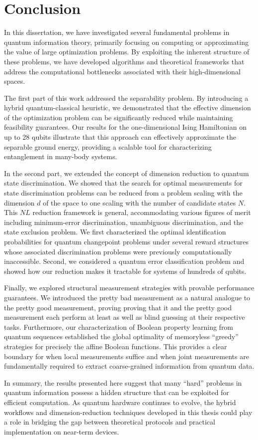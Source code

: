 \chapter{Conclusion}

In this dissertation, we have investigated several fundamental problems in quantum information theory, primarily focusing on computing or approximating the value of large optimization problems.
By exploiting the inherent structure of these problems, we have developed algorithms and theoretical frameworks that address the computational bottlenecks associated with their high-dimensional spaces.

The first part of this work addressed the separability problem. 
By introducing a hybrid quantum-classical heuristic, we demonstrated that the effective dimension of the optimization problem can be significantly reduced while maintaining feasibility guarantees. 
Our results for the one-dimensional Ising Hamiltonian on up to 28 qubits illustrate that this approach can effectively approximate the separable ground energy, providing a scalable tool for characterizing entanglement in many-body systems.

In the second part, we extended the concept of dimension reduction to quantum state discrimination. 
We showed that the search for optimal measurements for state discrimination problems can be reduced from a problem scaling with the dimension $d$ of the space to one scaling with the number of candidate states $N$. 
This $N L$ reduction framework is general, accommodating various figures of merit including minimum-error discrimination, unambiguous discrimination, and the state exclusion problem. 
We first characterized the optimal identification probabilities for quantum changepoint problems under several reward structures whose associated discrimination problems were previously computationally inaccessible. 
Second, we considered a quantum error classification problem and showed how our reduction makes it tractable for systems of hundreds
of qubits.

Finally, we explored structural measurement strategies %
with provable performance guarantees.
We introduced the pretty bad measurement as a natural analogue to the pretty good measurement, proving %
proving that it and the pretty good measurement each perform at least as well as blind guessing at their respective tasks.
Furthermore, our characterization of Boolean property learning from quantum sequences established the global optimality of memoryless ``greedy'' strategies for precisely the affine Boolean functions. 
This provides a clear boundary for when local measurements suffice and when joint measurements are fundamentally required to extract coarse-grained information from quantum data.

In summary, the results presented here suggest that many ``hard'' problems in quantum information possess a hidden structure that can be exploited for efficient computation. 
As quantum hardware continues to evolve, the hybrid workflows and dimension-reduction techniques developed in this thesis could play a role in bridging the gap between theoretical protocols and practical implementation on near-term devices.